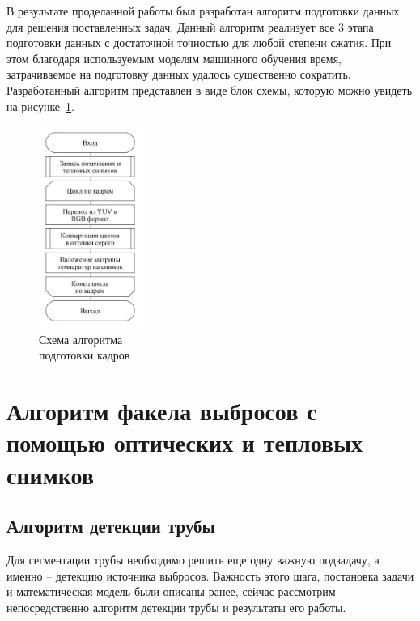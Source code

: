 \documentclass[14pt, a4paper]{extreport}
\begin{document}
	В результате проделанной работы был разработан алгоритм подготовки данных для решения поставленных задач. Данный алгоритм реализует все 3 этапа подготовки данных с достаточной точностью для любой степени сжатия. При этом благодаря используемым моделям машинного обучения время, затрачиваемое на подготовку данных удалось существенно сократить. Разработанный алгоритм представлен в виде блок схемы, которую можно увидеть на рисунке~\ref{fig:fullprepare}.
	\vspace*{-0.2cm}
	\begin{figure}[h!]
		\centering
		\includegraphics[width = 0.3\textwidth]{image/chapter_2/fullprepare}	
		\vspace*{-0.4cm}\caption{Схема алгоритма \\подготовки кадров}
		\label{fig:fullprepare}
	\end{figure}
	
	\section[\vspace*{-0.22cm}Алгоритм сегментации факела выбросов с помощью оптических \\ \hspace*{-0.75cm}и тепловых снимков]{\vspace*{-0.22cm}Алгоритм  факела выбросов с помощью оптических и тепловых \\ \hspace*{-2.05cm}снимков}
	\subsection{Алгоритм детекции трубы}
	
	Для сегментации трубы необходимо решить еще одну важную подзадачу, а именно -- детекцию источника выбросов. Важность этого шага, постановка задачи и математическая модель были описаны ранее, сейчас рассмотрим непосредственно алгоритм детекции трубы и результаты его работы.
	
\end{document}
